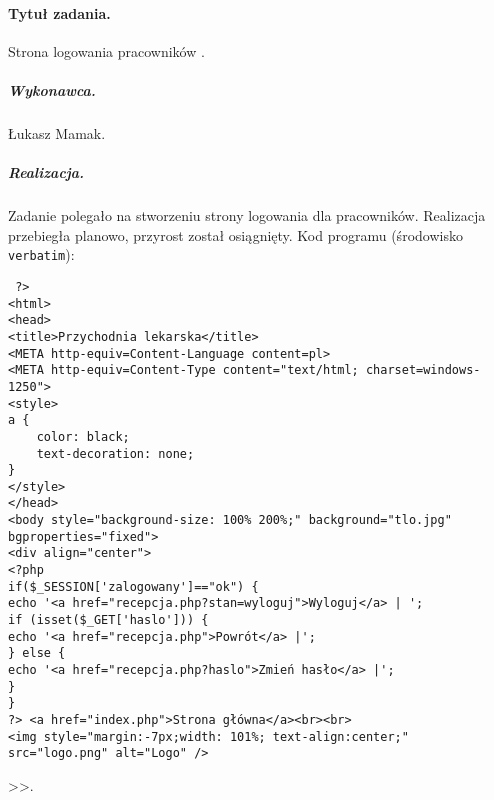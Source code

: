\documentclass[a4paper]{article} \usepackage{polski} \usepackage[cp1250]{inputenc} \usepackage{url}
\begin{document}
\paragraph{Tytuł zadania.} Strona logowania pracowników . \subparagraph{Wykonawca.} Łukasz Mamak. \subparagraph{Realizacja.} Zadanie polegało na stworzeniu strony logowania dla pracowników. Realizacja przebiegła planowo, przyrost został osiągnięty.  Kod programu (środowisko \texttt{verbatim}): \begin{verbatim} ?>
<html>
<head>
<title>Przychodnia lekarska</title>
<META http-equiv=Content-Language content=pl>
<META http-equiv=Content-Type content="text/html; charset=windows-1250">
<style>
a {
    color: black;
    text-decoration: none;
}
</style>
</head>
<body style="background-size: 100% 200%;" background="tlo.jpg" bgproperties="fixed">
<div align="center">
<?php
if($_SESSION['zalogowany']=="ok") {
echo '<a href="recepcja.php?stan=wyloguj">Wyloguj</a> | ';
if (isset($_GET['haslo'])) {
echo '<a href="recepcja.php">Powrót</a> |';
} else {
echo '<a href="recepcja.php?haslo">Zmień hasło</a> |';
}
}
?> <a href="index.php">Strona główna</a><br><br>
<img style="margin:-7px;width: 101%; text-align:center;" src="logo.png" alt="Logo" />
 \end{verbatim}>>.
\end{document}
